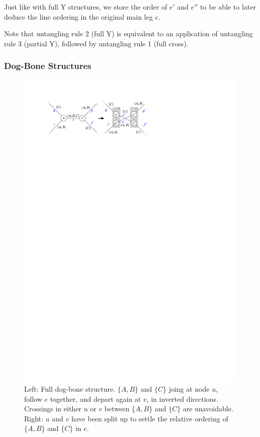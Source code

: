 \documentclass[format=acmsmall, review=false, screen=true]{acmart}
\begin{document}
Just like with full Y structures, we store the order of $e'$ and $e''$ to be able to later deduce the line ordering in the original main leg $e$.

Note that untangling rule 2 (full Y) is equivalent to an application of untangling rule 3 (partial Y), followed by untangling rule 1 (full cross).

\subsubsection{Dog-Bone Structures}\label{SEC:dogbone}

\begin{figure}
\centering
  \includegraphics[width=.7\textwidth, page=1]{figures/untangling/dogbone.pdf}
  \caption{Left: Full dog-bone structure. $\{A, B\}$ and $\{C\}$ joing at node $u$, follow $e$ together, and depart again at $v$, in inverted directions. Crossings in either $u$ or $v$ between $\{A, B\}$ and $\{C\}$ are unavoidable. Right: $u$ and $v$ have been split up to settle the relative ordering of $\{A, B\}$ and $\{C\}$ in $e$.}  
  \label{FIG:untangle_dogbone}

\end{figure}
\end{document}
